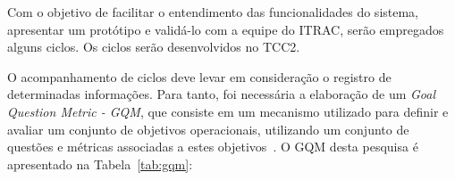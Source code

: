 Com o objetivo de facilitar o entendimento das funcionalidades do sistema, apresentar um protótipo e validá-lo com a equipe do ITRAC, serão empregados alguns ciclos. Os ciclos serão desenvolvidos no TCC2.

O acompanhamento de ciclos deve levar em consideração o registro de determinadas informações. Para tanto, foi necessária a elaboração de um \textit{Goal Question Metric - GQM}, que consiste em um mecanismo utilizado para definir e avaliar um conjunto de objetivos operacionais, utilizando um conjunto de questões e métricas associadas a estes objetivos~\cite{basili1994goal}. O GQM desta pesquisa é apresentado na Tabela~\ref{tab:gqm}:

